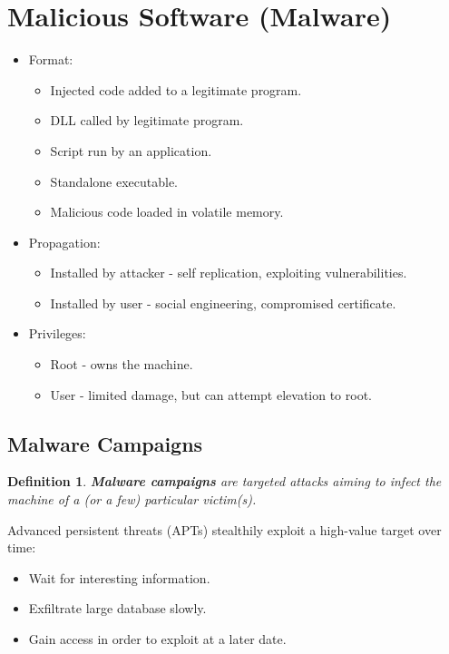 \documentclass[11pt]{article}
\newtheorem{defn}{Definition}
\begin{document}
\section{Malicious Software (Malware)}
\begin{itemize}
  \item Format:
    \begin{itemize}
      \item Injected code added to a legitimate program.
      \item DLL called by legitimate program.
      \item Script run by an application.
      \item Standalone executable.
      \item Malicious code loaded in volatile memory.
    \end{itemize}
  \item Propagation:
    \begin{itemize}
      \item Installed by attacker - self replication, exploiting vulnerabilities.
      \item Installed by user - social engineering, compromised certificate.
    \end{itemize}
  \item Privileges:
    \begin{itemize}
      \item Root - owns the machine.
      \item User - limited damage, but can attempt elevation to root.
    \end{itemize}
\end{itemize}

\subsection{Malware Campaigns}
\begin{defn}
  \textbf{Malware campaigns} are targeted attacks aiming to infect the machine of a (or a few) particular victim(s).
\end{defn}

Advanced persistent threats (APTs) stealthily exploit a high-value target over time:
\begin{itemize}
  \item Wait for interesting information.
  \item Exfiltrate large database slowly.
  \item Gain access in order to exploit at a later date.
\end{itemize}
\end{document}
